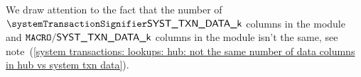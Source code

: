 \saNote{}
We draw attention to the fact that the number of
$\systemTxnDataCol{k}$ columns in the \hubMod{} module and
$\texttt{MACRO}\textsf{/}{\textsf{\textsf{SYST\_TXN\_DATA\_k}}}$ columns in the \systTxnDataMod{} module
isn't the same,
see note~(\ref{system transactions: lookups: hub: not the same number of data columns in hub vs system txn data}).

